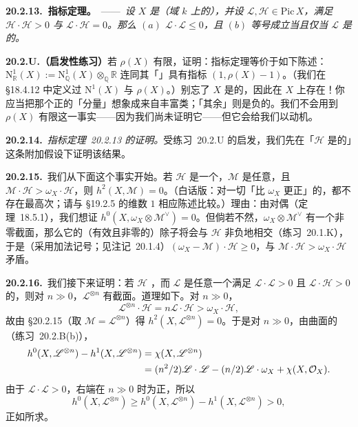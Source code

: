 \textbf{20.2.13.\ \trHodge{}指标定理。}\ ——\ \emph{设 $X$ 是（域 $k$ 上的）\trIrreducible\trSmooth\trProjective\trSurface，并设 $\mathscr{L},\mathscr{H}\in\mathrm{Pic}\,X$，满足 $\mathscr{H}\cdot\mathscr{H}>0$ 与 $\mathscr{L}\cdot\mathscr{H}=0$。那么 $(a)$ $\mathscr{L}\cdot\mathscr{L}\le 0$，且 $(b)$ 等号成立当且仅当 $\mathscr{L}$ 是\trNumericallyTrivial{}的。}

\textbf{20.2.U.（启发性练习）}\quad 若 $\rho(X)$ 有限，证明：\trHodge{}指标定理等价于如下陈述：$\mathrm{N}^1_{\mathbb{R}}(X):=\mathrm{N}^1_{\mathbb{Q}}(X)\otimes_{\mathbb{Q}}\mathbb{R}$ 连同其「\trIntersectionForm」具有指标 $(1,\rho(X)-1)$。（我们在 \S18.4.12 中定义过 $\mathrm{N}^1(X)$ 与 $\rho(X)$。）别忘了 $X$ 是\trProjective{}的，因此在 $X$ 上存在\trAmple\trLineBundle！你应当把那个正的「分量」想象成来自丰富类；「其余」则是负的。我们不会用到 $\rho(X)$ 有限这一事实——因为我们尚未证明它——但它会给我们以动机。

\textbf{20.2.14.}\ \emph{\mbox{\trHodge{}指标定理~20.2.13} 的证明。}\quad 受\mbox{练习~20.2.U} 的启发，我们先在「$\mathscr{H}$ 是\trAmple{}的」这条附加假设下证明该结果。

\textbf{20.2.15.}\ 我们从下面这个事实开始。若 $\mathscr{H}$ 是一个\trAmple\trInvertibleSheaf，$\mathscr{M}$ 是任意\trInvertibleSheaf，且 $\mathscr{M}\cdot\mathscr{H}>\omega_X\cdot\mathscr{H}$，则 $h^2(X,\mathscr{M})=0$。（白话版：对一切「比 $\omega_X$ 更正」的\trInvertibleSheaf，都不存在最高次\trCohomology；请与 \S19.2.5 的维数 $1$ 相应陈述比较。）理由：由\trSerre{}对偶（\mbox{定理~18.5.1}），我们想证 $h^0(X,\omega_X\otimes\mathscr{M}^{\vee})=0$。但倘若不然，$\omega_X\otimes\mathscr{M}^{\vee}$ 有一个非零截面，那么它的（有效且非零的）除子将会与 $\mathscr{H}$ 非负地相交（\mbox{练习~20.1.K}），于是（采用加法记号；见\mbox{注记~20.1.4}）$(\omega_X-\mathscr{M})\cdot\mathscr{H}\ge 0$，与 $\mathscr{M}\cdot\mathscr{H}>\omega_X\cdot\mathscr{H}$ 矛盾。

\textbf{20.2.16.}\ 我们接下来证明：若 $\mathscr{H}$ \trAmple，而 $\mathscr{L}$ 是任意一个满足 $\mathscr{L}\cdot\mathscr{L}>0$ 且 $\mathscr{L}\cdot\mathscr{H}>0$ 的\trInvertibleSheaf，则对 $n\gg 0$，$\mathscr{L}^{\otimes n}$ 有截面。道理如下。对 $n\gg 0$，
\[
\mathscr{L}^{\otimes n}\cdot\mathscr{H}=n\mathscr{L}\cdot\mathscr{H}>\omega_X\cdot\mathscr{H},
\]
故由 \S20.2.15（取 $\mathscr{M}=\mathscr{L}^{\otimes n}$）得 $h^2(X,\mathscr{L}^{\otimes n})=0$。于是对 $n\gg 0$，由曲面的\trRiemannRoch{}（\mbox{练习~20.2.B(b)}），
\[
\begin{aligned}
h^0(X,\mathscr{L}^{\otimes n})-h^1(X,\mathscr{L}^{\otimes n})&=\chi(X,\mathscr{L}^{\otimes n})\\
&=(n^2/2)\mathscr{L}\cdot\mathscr{L}-(n/2)\mathscr{L}\cdot\omega_X+\chi(X,\mathcal{O}_X).
\end{aligned}
\]
由于 $\mathscr{L}\cdot\mathscr{L}>0$，右端在 $n\gg 0$ 时为正，所以
\[
h^0(X,\mathscr{L}^{\otimes n})\ge h^0(X,\mathscr{L}^{\otimes n})-h^1(X,\mathscr{L}^{\otimes n})>0,
\]
正如所求。

